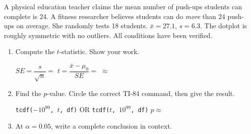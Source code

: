 \documentclass[10pt]{article}
\begin{document}
\namedateperiod

\vspace{0.15in}

A physical education teacher claims the mean number of push-ups students can complete is
24. A fitness researcher believes students can do \emph{more} than 24 push-ups on average.
She randomly tests 18 students. $\bar x = 27.1$, $s = 6.3$. The dotplot is roughly symmetric
with no outliers. All conditions have been verified.

\begin{enumerate}
  \item Compute the $t$-statistic. Show your work.

        $SE = \dfrac{s}{\sqrt{n}} = $ \blank{3.5cm} \qquad
        $t = \dfrac{\bar x - \mu_0}{SE} = $ \blank{4cm} $\approx$ \blank{2cm}

  \item Find the $p$-value. Circle the correct TI-84 command, then give the result.

        \texttt{tcdf($-10^{99}$, $t$, df)} \quad OR \quad \texttt{tcdf($t$, $10^{99}$, df)} \quad
        $p \approx$ \blank{2cm}

  \item At $\alpha = 0.05$, write a complete conclusion in context.
\end{enumerate}
\end{document}
